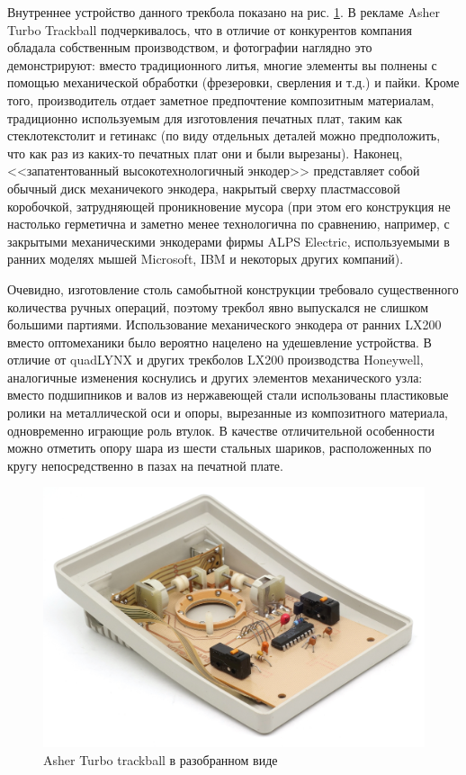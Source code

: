 \documentclass[11pt, a4paper]{article}
\begin{document}
Внутреннее устройство данного трекбола показано на рис. \ref{fig:AsherInside}. В рекламе Asher Turbo Trackball подчеркивалось, что в отличие от конкурентов компания обладала собственным производством, и фотографии наглядно это демонстрируют: вместо традиционного литья, многие элементы вы полнены с помощью механической обработки (фрезеровки, сверления и т.д.) и пайки. Кроме того,  производитель отдает заметное предпочтение композитным материалам, традиционно используемым для изготовления печатных плат, таким как стеклотекстолит и гетинакс (по виду отдельных деталей можно предположить, что как раз из каких-то печатных плат они и были вырезаны). Наконец, <<запатентованный высокотехнологичный энкодер>> представляет собой обычный диск механичекого энкодера, накрытый сверху пластмассовой коробочкой, затрудняющей проникновение мусора (при этом его конструкция не настолько герметична и заметно менее технологична по сравнению, например, с закрытыми механическими энкодерами фирмы ALPS Electric, используемыми в ранних моделях мышей Microsoft, IBM и некоторых других компаний).

Очевидно, изготовление столь самобытной конструкции требовало существенного количества ручных операций, поэтому трекбол явно выпускался не слишком большими партиями.
Использование механического энкодера от ранних LX200 вместо оптомеханики было вероятно нацелено на удешевление устройства. В отличие от quadLYNX и других трекболов LX200 производства Honeywell, аналогичные изменения коснулись и других элементов механического узла: вместо подшипников и валов из нержавеющей стали использованы пластиковые ролики на металлической оси и опоры, вырезанные из композитного материала, одновременно играющие роль втулок. В качестве отличительной особенности можно отметить опору шара из шести стальных шариков, расположенных по кругу непосредственно в пазах на печатной плате.

\begin{figure}[h]
    \centering
    \includegraphics[scale=0.7]{1988_asher_turbo_trackball/inside_60.jpg}
    \caption{Asher Turbo trackball в разобранном виде}
    \label{fig:AsherInside}
\end{figure}
\end{document}
